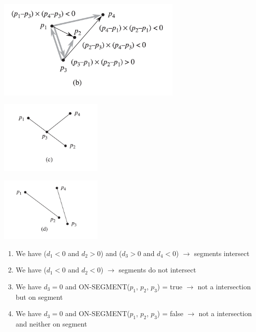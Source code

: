 \documentclass[10pt,a4paper,twocolumn]{article}
\begin{document}
\begin{center}
	\includegraphics[width=9cm]{images/line-intersection-exampleb}
\end{center}

\begin{center}
	\includegraphics[width=5cm]{images/line-intersection-examplec}
\end{center}

\begin{center}
	\includegraphics[width=5cm]{images/line-intersection-exampled}
\end{center}

\begin{enumerate}[label=(\alph*)]
	\item We have ($d_{1}<0$ and $d_{2}>0$) and ($d_{3} > 0$ and $d_{4} < 0$) $\rightarrow$ segments intersect
	\item We have ($d_{1}<0$ and $d_{2}<0$) $\rightarrow$ segments do not intersect
	\item We have $d_{3}=0$ and ON-SEGMENT($p_{1}$, $p_{2}$, $p_{3}$) = true $\rightarrow$ not a intersection but on segment
	\item We have $d_{3}=0$ and ON-SEGMENT($p_{1}$, $p_{2}$, $p_{3}$) = false $\rightarrow$ not a intersection and neither on segment
\end{enumerate}
\end{document}

